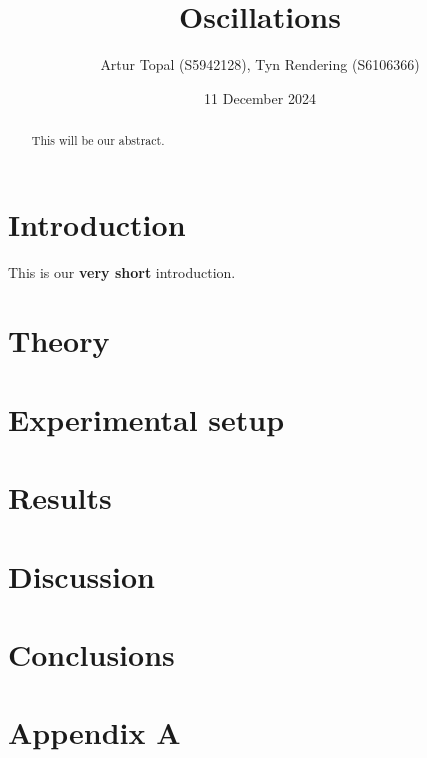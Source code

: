 \documentclass[a4paper,12pt]{article}
\title{Oscillations}
\author{Artur Topal (S5942128), Tyn Rendering (S6106366)}
\date{11 December 2024}
\begin{document}
\maketitle

\begin{abstract}
This will be our abstract.
\end{abstract}

\section{Introduction}
This is our \textbf{very short} introduction.

\section{Theory}


\section{Experimental setup}


\section{Results}


\section{Discussion}


\section{Conclusions}


\appendix
\section{Appendix A}


\end{document}
